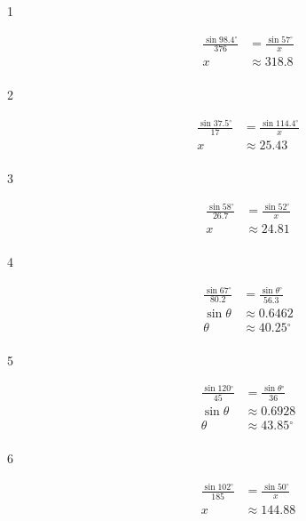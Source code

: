 \documentclass{exam}
\newcommand{\dg}{\ensuremath{^\circ}}
\begin{document}
    \begin{description}

      \item[1] 
        \begin{align*}
          \frac{\sin 98.4 \dg}{376} & = \frac{\sin 57 \dg}{x} \\
          x                         & \approx \boxed{ 318.8 } \\
        \end{align*}

      \item[2] 
        \begin{align*}
          \frac{\sin 37.5 \dg}{17} & = \frac{\sin 114.4 \dg}{x} \\
          x                        & \approx \boxed{ 25.43 } \\
        \end{align*}

      \item[3] 
        \begin{align*}
          \frac{\sin 58 \dg}{26.7} & = \frac{\sin 52 \dg}{x} \\
          x                         & \approx \boxed{ 24.81 } \\
        \end{align*}

      \item[4] 
        \begin{align*}
          \frac{\sin 67 \dg}{80.2} & = \frac{\sin \theta \dg}{56.3} \\
          \sin \theta              & \approx 0.6462 \\
          \theta                   & \approx \boxed{ 40.25 \dg } \\
        \end{align*}

      \item[5] 
        \begin{align*}
          \frac{\sin 120 \dg}{45} & = \frac{\sin \theta \dg}{36} \\
          \sin \theta             & \approx 0.6928 \\
          \theta                  & \approx \boxed{ 43.85 \dg } \\
        \end{align*}

      \item[6] 
        \begin{align*}
          \frac{\sin 102 \dg}{185} & = \frac{\sin 50 \dg}{x} \\
          x                        & \approx \boxed{ 144.88 } \\
        \end{align*}


\end{description}
\end{document}
